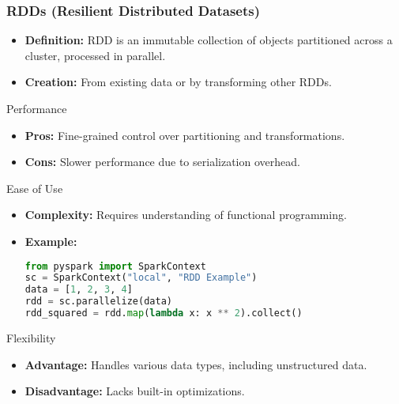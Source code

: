 \documentclass[aspectratio=169]{beamer}
\begin{document}
\begin{frame}[fragile]
    \frametitle{RDDs (Resilient Distributed Datasets)}
    
    \begin{itemize}
        \item \textbf{Definition:} RDD is an immutable collection of objects partitioned across a cluster, processed in parallel.
        \item \textbf{Creation:} From existing data or by transforming other RDDs.
    \end{itemize}
    
    \begin{block}{Performance}
        \begin{itemize}
            \item \textbf{Pros:} Fine-grained control over partitioning and transformations.
            \item \textbf{Cons:} Slower performance due to serialization overhead.
        \end{itemize}
    \end{block}
    
    \begin{block}{Ease of Use}
        \begin{itemize}
            \item \textbf{Complexity:} Requires understanding of functional programming.
            \item \textbf{Example:}
            \begin{lstlisting}[language=Python]
from pyspark import SparkContext
sc = SparkContext("local", "RDD Example")
data = [1, 2, 3, 4]
rdd = sc.parallelize(data)
rdd_squared = rdd.map(lambda x: x ** 2).collect()
            \end{lstlisting}
        \end{itemize}
    \end{block}
    
    \begin{block}{Flexibility}
        \begin{itemize}
            \item \textbf{Advantage:} Handles various data types, including unstructured data.
            \item \textbf{Disadvantage:} Lacks built-in optimizations.
        \end{itemize}
    \end{block}
\end{frame}
\end{document}
